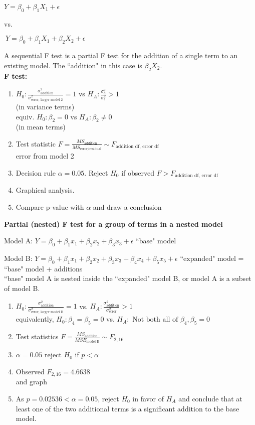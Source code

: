 \documentclass[a4paper, 11pt, twoside]{article}
\begin{document}
$Y =\beta_0+\beta_1X_1+\epsilon$ 

vs.

$\ Y=\beta_0+\beta_1X_1+\beta_2X_2+\epsilon$

A sequential F test is a partial F test for the addition of a single term to an existing model. The ``addition" in this case is $\beta_2X_2$.\\

\textbf{F test:}

\begin{enumerate}
	\item $H_0: \frac{\sigma_{\text{addition}}^2}{\sigma^2_{\text{error, larger model 2}}}=1$ vs $H_A:\frac{\sigma^2_a}{\sigma^2_{\epsilon}}> 1$\\
	(in variance terms)\\
	equiv. $H_0:\beta_2=0$ vs $H_A: \beta_2\not=0$\\
	(in mean terms)
	\item Test statistic $F=\frac{MS_{\text{addition}}}{MS_{\text{error/residual}}}\sim F_{\text{addition df, error df}}$\\
	error from model 2
	\item Decision rule $\alpha=0.05$. Reject $H_0$ if observed $F> F_{\text{addition df, error df}}$
	\item Graphical analysis.
	\item Compare p-value with $\alpha$ and draw a conclusion\\
\end{enumerate}

\textbf{Partial (nested) F test for a group of terms in a nested model}

Model A: $Y=\beta_0+\beta_1x_1+\beta_2x_2+\beta_3x_3+\epsilon$ ``base" model

Model B: $Y=\beta_0+\beta_1x_1+\beta_2x_2+\beta_3x_3+\beta_4x_4+\beta_5x_5+\epsilon$ ``expanded" model = ``base" model + additions\\

``base" model A is nested inside the ``expanded" model B, or model A is a subset of model B.

\begin{enumerate}
	\item $H_0: \frac{\sigma^2_{\text{addition}}}{\sigma^2_{\text{error, larger model B}}}=1$ vs. $H_A: \frac{\sigma^2_{\text{addition}}}{\sigma^2_{\text{error}}}> 1$\\
	equivalently, $H_0: \beta_4=\beta_5=0$ vs. $H_A:\text{ Not both all of } \beta_4, \beta_5 = 0$
	\item Test statistics $F=\frac{MS_{\text{addition}}}{MSE_{\text{model B}}} \sim F_{2, 16}$
	\item $\alpha=0.05$ reject $H_0$ if $ p< \alpha$
	\item Observed $F_{2, 16}=4.6638$\\
	and graph
	\item As $p=0.02536 < \alpha=0.05$, reject $H_0$ in favor of $H_A$ and conclude that at least one of the two additional terms is a significant addition to the base model.
\end{enumerate}
\end{document}

